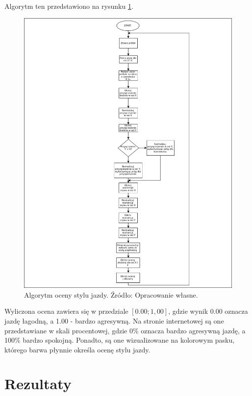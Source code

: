 Algorytm ten przedstawiono na rysunku \ref{fig:image_driving_analysis_alghoritm}.

\begin{figure}[H]
	\centering
	\includegraphics[width=15cm]{img/driving_analysis/driving_analysis.png}
	\caption{Algorytm oceny stylu jazdy. Źródło: Opracowanie własne.}
	\label{fig:image_driving_analysis_alghoritm}
\end{figure}

Wyliczona ocena zawiera się w przedziale $[0.00; 1,00]$, gdzie wynik 0.00 oznacza jazdę łagodną, a 1.00 - bardzo agresywną. Na stronie internetowej są one przedstawiane w skali procentowej, gdzie 0\% oznacza bardzo agresywną jazdę, a 100\% bardzo spokojną. Ponadto, są one wizualizowane na kolorowym pasku, którego barwa płynnie określa ocenę stylu jazdy.

\section{Rezultaty}

